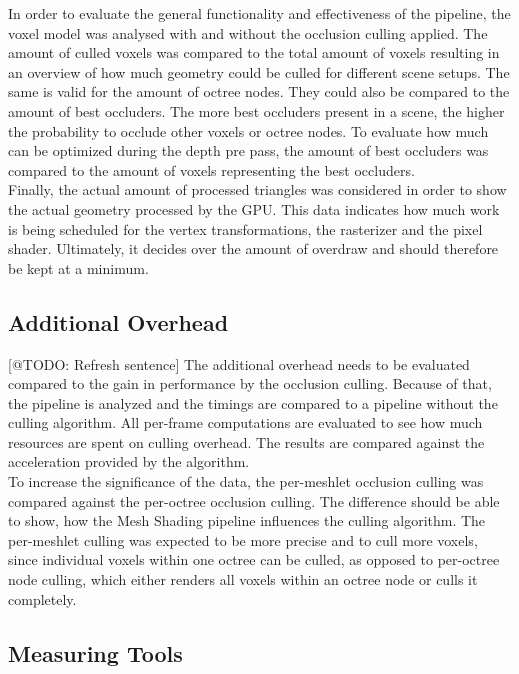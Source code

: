 In order to evaluate the general functionality and effectiveness of the pipeline, the voxel model was analysed 
with and without the occlusion culling applied. The amount of culled voxels was compared to the total amount of 
voxels resulting in an overview of how much geometry could be culled for different scene setups. The same is 
valid for the amount of octree nodes. They could also be compared to the amount of best occluders. The more best 
occluders present in a scene, the higher the probability to occlude other voxels or octree nodes. To evaluate 
how much can be optimized during the depth pre pass, the amount of best occluders was compared to the amount 
of voxels representing the best occluders. \\

\noindent
Finally, the actual amount of processed triangles was considered in order to show the actual geometry processed 
by the \ac{GPU}. This data indicates how much work is being scheduled for the vertex transformations, the rasterizer 
and the pixel shader. Ultimately, it decides over the amount of overdraw and should therefore be kept at a minimum.


\subsection*{Additional Overhead}

[@TODO: Refresh sentence]
The additional overhead needs to be evaluated compared to the gain in performance by the occlusion culling. 
Because of that, the pipeline is analyzed and the timings are compared to a pipeline without the culling 
algorithm. All per-frame computations are evaluated to see how much resources are spent on culling overhead. 
The results are compared against the acceleration provided by the algorithm.\\

\noindent
To increase the significance of the data, the per-meshlet occlusion culling was compared against the 
per-octree occlusion culling. The difference should be able to show, how the Mesh Shading pipeline 
influences the culling algorithm. The per-meshlet culling was expected to be more precise and to cull 
more voxels, since individual voxels within one octree can be culled, as opposed to per-octree node 
culling, which either renders all voxels within an octree node or culls it completely. 


\subsection*{Measuring Tools}

